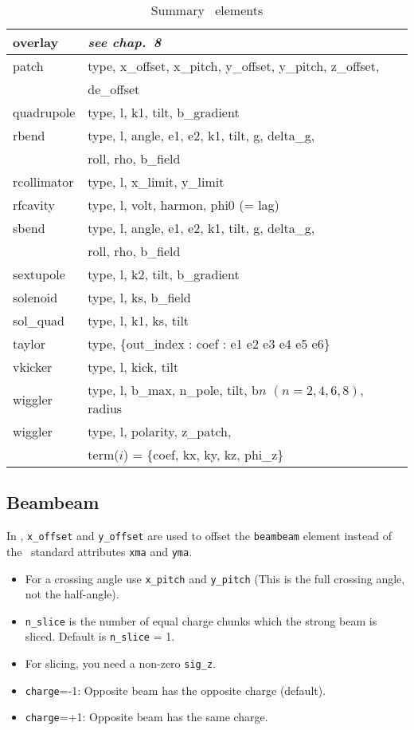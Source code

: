 \begin{table}
{\begin{tabular}{|l|l|}
    overlay       &  {\sl see chap.~8} \\ \hline
    patch         &  type, x\_offset, x\_pitch, y\_offset, y\_pitch, z\_offset, \\
                  &  de\_offset \\ \hline
    quadrupole    &  type, l, k1, tilt, b\_gradient \\ \hline
    rbend         &  type, l, angle, e1, e2, k1, tilt, g, delta\_g, \\
                  &  roll, rho, b\_field \\ \hline
    rcollimator   &  type, l, x\_limit, y\_limit \\ \hline
    rfcavity      &  type, l, volt, harmon, phi0 (= lag)  \\ \hline
    sbend         &  type, l, angle, e1, e2, k1, tilt, g, delta\_g, \\
                  &  roll, rho, b\_field \\ \hline
    sextupole     &  type, l, k2, tilt, b\_gradient \\ \hline
    solenoid      &  type, l, ks, b\_field \\ \hline 
    sol\_quad     &  type, l, k1, ks, tilt \\ \hline
    taylor        &  type, \{out\_index : coef : e1 e2 e3 e4 e5 e6\} \\ \hline
    vkicker       &  type, l, kick, tilt \\ \hline
    wiggler       &  type, l, b\_max, n\_pole, tilt, b$n$ $(n=2,4,6,8)$, radius \\ \hline
    wiggler       &  type, l, polarity, z\_patch, \\
                  &  term($i$) = \{coef, kx, ky, kz, phi\_z\} \\ \hline
\end{tabular}}
\caption{Summary \bmad\ elements}
\end{table}

\subsection{Beambeam}
In \bmad, {\tt x\_offset} and {\tt y\_offset} are used to offset the {\tt beambeam} element instead of
the \mad\ standard attributes {\tt xma} and {\tt yma}.
\begin{itemize}
\item For a crossing angle use {\tt x\_pitch} and {\tt y\_pitch} (This is the full crossing angle,
not the half-angle).
\item {\tt n\_slice} is the number of equal charge chunks which the strong beam is sliced.
      Default is {\tt n\_slice} = 1.
\item For slicing, you need a non-zero {\tt sig\_z}.
\item {\tt charge}=-1: Opposite beam has the opposite charge (default).
\item {\tt charge}=+1: Opposite beam has the same charge.   
\end{itemize}

